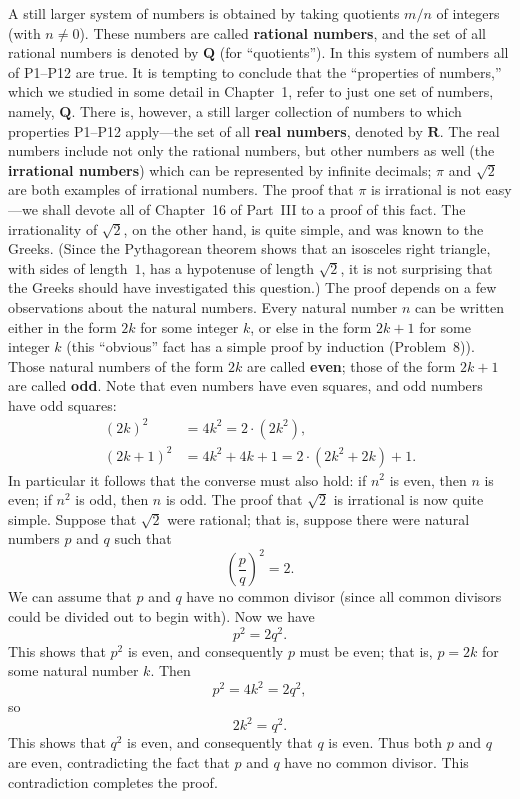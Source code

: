 A still larger system of numbers is obtained by taking quotients $m/n$ of
integers (with $n \neq 0$). These numbers are called \textbf{rational
numbers}, and the set of all rational numbers is denoted by $\mathbf{Q}$ (for
``quotients''). In this system of numbers all of P1--P12 are true. It is
tempting to conclude that the ``properties of numbers,'' which we studied in
some detail in Chapter~1, refer to just one set of numbers, namely,
$\mathbf{Q}$. There is, however, a still larger collection of numbers to which
properties P1--P12 apply---the set of all \textbf{real numbers}, denoted by
$\mathbf{R}$. The real numbers include not only the rational numbers, but
other numbers as well (the \textbf{irrational numbers}) which can be
represented by infinite decimals; $\pi$ and $\sqrt{2}$ are both examples of
irrational numbers. The proof that $\pi$ is irrational is not easy---we shall
devote all of Chapter~16 of Part~III to a proof of this fact. The
irrationality of $\sqrt{2}$, on the other hand, is quite simple, and was known
to the Greeks. (Since the Pythagorean theorem shows that an isosceles right
triangle, with sides of length~$1$, has a hypotenuse of length $\sqrt{2}$, it
is not surprising that the Greeks should have investigated this question.)
The proof depends on a few observations about the natural numbers. Every
natural number $n$ can be written either in the form $2k$ for some integer
$k$, or else in the form $2k + 1$ for some integer $k$ (this ``obvious'' fact
has a simple proof by induction (Problem~8)). Those natural numbers of the
form $2k$ are called \textbf{even}; those of the form $2k+1$ are called
\textbf{odd}. Note that even numbers have even squares, and odd numbers have
odd squares:
\begin{align*}
(2k)^2 &= 4k^2 = 2 \cdot (2k^2),\\
(2k+1)^2 &= 4k^2 + 4k + 1 = 2 \cdot (2k^2 + 2k) + 1.
\end{align*}
In particular it follows that the converse must also hold: if $n^2$ is even,
then $n$ is even; if $n^2$ is odd, then $n$ is odd. The proof that $\sqrt{2}$
is irrational is now quite simple. Suppose that $\sqrt{2}$ were rational; that
is, suppose there were natural numbers $p$ and $q$ such that
\[ \left(\frac{p}{q}\right)^2 = 2. \]
We can assume that $p$ and $q$ have no common divisor (since all common
divisors could be divided out to begin with). Now we have
\[ p^2 = 2q^2. \]
This shows that $p^2$ is even, and consequently $p$ must be even; that is,
$p = 2k$ for some natural number $k$. Then
\[ p^2 = 4k^2 = 2q^2, \]
so
\[ 2k^2 = q^2. \]
This shows that $q^2$ is even, and consequently that $q$ is even. Thus both
$p$ and $q$ are even, contradicting the fact that $p$ and $q$ have no common
divisor. This contradiction completes the proof.

